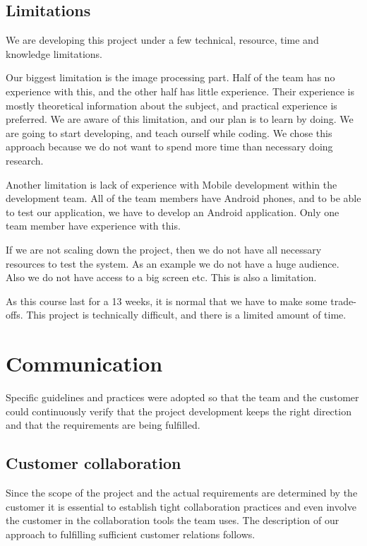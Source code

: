 \subsection{Limitations}
\label{sec:limitations}
We are developing this project under a few technical, resource, time and knowledge limitations. 

Our biggest limitation is the image processing part. Half of the team has no experience with this, and the other half has little experience. Their experience is mostly theoretical information about the subject, and practical experience is preferred. We are aware of this limitation, and our plan is to learn by doing. We are going to start developing, and teach ourself while coding. We chose this approach because we do not want to spend more time than necessary doing research.

Another limitation is lack of experience with Mobile development within the development team. All of the team members have Android phones, and to be able to test our application, we have to develop an Android application. Only one team member have experience with this. 

If we are not scaling down the project, then we do not have all necessary resources to test the system. As an example we do not have a huge audience. Also  we do not have access to a big screen etc. This is also a limitation.  

As this course last for a 13 weeks, it is normal that we have to make some trade-offs.
This project is technically difficult, and there is a limited amount of time. 


\section{Communication}
Specific guidelines and practices were adopted so that the team and the customer could continuously verify that the project development keeps the right direction and that the requirements are being fulfilled.

\subsection{Customer collaboration}
Since the scope of the project and the actual requirements are determined by the customer it is essential to establish tight collaboration practices and even involve the customer in the collaboration tools the team uses. The description of our approach to fulfilling sufficient customer relations follows.

